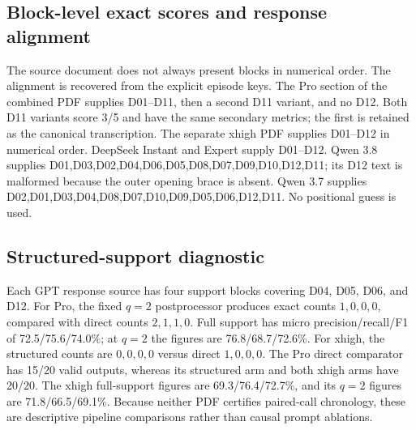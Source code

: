 \subsection{Block-level exact scores and response alignment}

\begin{table}[ht]
\centering\scriptsize
\setlength{\tabcolsep}{2.5pt}
\caption{Exact optima per five-episode direct block.  Each row sums to the
main-table numerator.}
\label{tab:block-scores}
\end{table}

The source document does not always present blocks in numerical order.  The
alignment is recovered from the explicit episode keys.  The Pro section of the
combined PDF supplies D01--D11, then a second D11 variant, and no D12.  Both D11 variants score 3/5 and have the
same secondary metrics; the first is retained as the canonical transcription.
The separate xhigh PDF supplies D01--D12 in numerical order.  DeepSeek Instant
and Expert supply D01--D12.  Qwen 3.8 supplies
D01,D03,D02,D04,D06,D05,D08,D07,D09,D10,D12,D11; its D12 text is malformed
because the outer opening brace is absent.  Qwen 3.7 supplies
D02,D01,D03,D04,D08,D07,D10,D09,D05,D06,D12,D11.  No positional guess is used.

\subsection{Structured-support diagnostic}

Each GPT response source has four support blocks covering D04, D05, D06, and D12.  For
Pro, the fixed $q=2$ postprocessor produces exact counts $1,0,0,0$, compared
with direct counts $2,1,1,0$.  Full support has micro precision/recall/F1 of
72.5/75.6/74.0\%; at $q=2$ the figures are 76.8/68.7/72.6\%.  For xhigh, the
structured counts are $0,0,0,0$ versus direct $1,0,0,0$.  The Pro direct
comparator has 15/20 valid outputs, whereas its structured arm and both xhigh
arms have 20/20.  The xhigh full-support
figures are 69.3/76.4/72.7\%, and its $q=2$ figures are 71.8/66.5/69.1\%.
Because neither PDF certifies paired-call chronology, these are descriptive
pipeline comparisons rather than causal prompt ablations.

